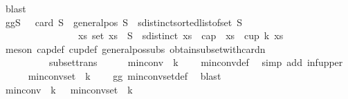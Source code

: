 \begin{isabellebody}
\ blast\isanewline
\ \ \ \ \ \ \isamarkupfalse%
\isanewline
\ \ \ \ \isakeywordONE{{\isacharbraceright}{\kern0pt}}\isamarkupfalse%
\isanewline
\ \ \ \ \isamarkupfalse%
\ gg{\isacharcolon}{\kern0pt}{\isachardoublequoteopen}{\isasymforall}S{\isachardot}{\kern0pt}\ {}\ {\isasymle}\ card\ S\ {\isasymand}\ general{\isacharunderscore}{\kern0pt}pos\ S\ {\isasymand}\ sdistinct{\isacharparenleft}{\kern0pt}sorted{\isacharunderscore}{\kern0pt}list{\isacharunderscore}{\kern0pt}of{\isacharunderscore}{\kern0pt}set\ S{\isacharparenright}{\kern0pt}\ {\isasymlongrightarrow}\isanewline
\ \ \ \ \ \ \ \ \ \ \ \ \ \ \ \ {\isacharparenleft}{\kern0pt}{\isasymexists}xs{\isachardot}{\kern0pt}\ set\ xs\ {\isasymsubseteq}\ S\ {\isasymand}\ sdistinct\ xs\ {\isasymand}\ {\isacharparenleft}{\kern0pt}cap\ {}\ xs\ {\isasymor}\ cup\ k\ xs{\isacharparenright}{\kern0pt}{\isacharparenright}{\kern0pt}{\isachardoublequoteclose}\isanewline
\ \ \ \ \ \ \isamarkupfalse%
\ {\isacharparenleft}{\kern0pt}meson\ cap{\isacharunderscore}{\kern0pt}def\ cup{\isacharunderscore}{\kern0pt}def\ general{\isacharunderscore}{\kern0pt}pos{\isacharunderscore}{\kern0pt}subs\ obtain{\isacharunderscore}{\kern0pt}subset{\isacharunderscore}{\kern0pt}with{\isacharunderscore}{\kern0pt}card{\isacharunderscore}{\kern0pt}n\isanewline
\ \ \ \ \ \ \ \ \ \ subset{\isacharunderscore}{\kern0pt}trans{\isacharparenright}{\kern0pt}\isanewline
\ \ \ \ \isamarkupfalse%
\ {\isachardoublequoteopen}min{\isacharunderscore}{\kern0pt}conv\ {}\ k\ {\isasymle}\ {}{\isachardoublequoteclose}\ \isamarkupfalse%
\ min{\isacharunderscore}{\kern0pt}conv{\isacharunderscore}{\kern0pt}def\ \isamarkupfalse%
\ {\isacharparenleft}{\kern0pt}simp\ add{\isacharcolon}{\kern0pt}\ inf{\isacharunderscore}{\kern0pt}upper{\isacharparenright}{\kern0pt}\isanewline
\ \ \ \ \isamarkupfalse%
\ {\isachardoublequoteopen}min{\isacharunderscore}{\kern0pt}conv{\isacharunderscore}{\kern0pt}set\ {}\ k\ {\isasymnoteq}\ {\isacharbraceleft}{\kern0pt}{\isacharbraceright}{\kern0pt}{\isachardoublequoteclose}\ \isamarkupfalse%
\ gg\ min{\isacharunderscore}{\kern0pt}conv{\isacharunderscore}{\kern0pt}set{\isacharunderscore}{\kern0pt}def\ \isamarkupfalse%
\ blast\isanewline
\ \ \isamarkupfalse%
\isanewline
\ \ \isamarkupfalse%
\ {\isachardoublequoteopen}min{\isacharunderscore}{\kern0pt}conv\ {}\ k\ {\isacharequal}{\kern0pt}\ {}{\isachardoublequoteclose}\ {\isachardoublequoteopen}min{\isacharunderscore}{\kern0pt}conv{\isacharunderscore}{\kern0pt}set\ {}\ k\ {\isasymnoteq}\ {\isacharbraceleft}{\kern0pt}{\isacharbraceright}{\kern0pt}{\isachardoublequoteclose}\isanewline

\end{isabellebody}
